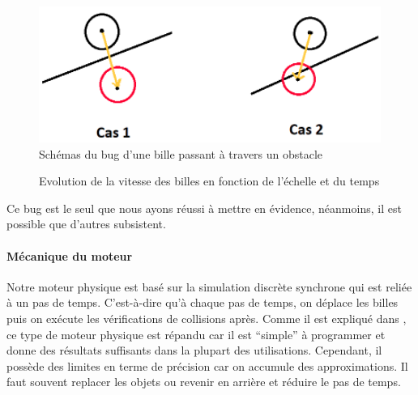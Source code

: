 \documentclass{report}
\begin{document}
\begin{figure}[H]
\centering
\includegraphics[scale=1]{bug_1.PNG}
\caption{Schémas du bug d'une bille passant à travers un obstacle}
\end{figure}

\begin{figure}[H]
\centering
{}
\caption{Evolution de la vitesse des billes en fonction de l'échelle et du temps}
\end{figure}

Ce bug est le seul que nous ayons réussi à mettre en évidence, néanmoins, il est possible que d'autres subsistent.

\newpage


\paragraph{Mécanique du moteur}

Notre moteur physique est basé sur la simulation discrète synchrone qui est reliée à un pas de temps. C’est-à-dire qu’à chaque pas de temps, on déplace les billes puis on exécute les vérifications de collisions après. Comme il est expliqué dans \cite{01}, ce type de moteur physique est répandu car il est “simple” à programmer et donne des résultats suffisants dans la plupart des utilisations. Cependant, il possède des limites en terme de précision car on accumule des approximations. Il faut souvent replacer les objets ou revenir en arrière et réduire le pas de temps. \\
\end{document}
